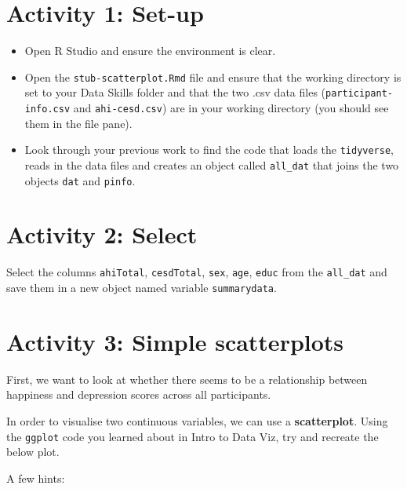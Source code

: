 \documentclass[
  oneside]{book}
\providecommand{\tightlist}{%
  \setlength{\itemsep}{0pt}\setlength{\parskip}{0pt}}
\begin{document}
\hypertarget{activity-1-set-up-3}{%
\section{Activity 1: Set-up}\label{activity-1-set-up-3}}

\begin{itemize}
\tightlist
\item
  Open R Studio and ensure the environment is clear.\\
\item
  Open the \texttt{stub-scatterplot.Rmd} file and ensure that the working directory is set to your Data Skills folder and that the two .csv data files (\texttt{participant-info.csv} and \texttt{ahi-cesd.csv}) are in your working directory (you should see them in the file pane).\\
\item
  Look through your previous work to find the code that loads the \texttt{tidyverse}, reads in the data files and creates an object called \texttt{all\_dat} that joins the two objects \texttt{dat} and \texttt{pinfo}.
\end{itemize}

\hypertarget{activity-2-select-1}{%
\section{Activity 2: Select}\label{activity-2-select-1}}

Select the columns \texttt{ahiTotal}, \texttt{cesdTotal}, \texttt{sex}, \texttt{age}, \texttt{educ} from the \texttt{all\_dat} and save them in a new object named variable \texttt{summarydata}.

\hypertarget{activity-3-simple-scatterplots}{%
\section{Activity 3: Simple scatterplots}\label{activity-3-simple-scatterplots}}

First, we want to look at whether there seems to be a relationship between happiness and depression scores across all participants.

In order to visualise two continuous variables, we can use a \textbf{scatterplot}. Using the \texttt{ggplot} code you learned about in Intro to Data Viz, try and recreate the below plot.

A few hints:
\end{document}
